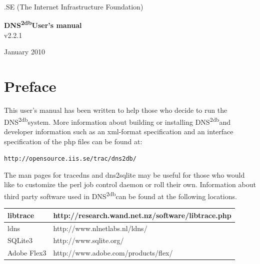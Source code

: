 \documentclass[a4paper]{article}
\newcommand{\dnsdb}{DNS\textsuperscript{2db}\hspace{3pt}}
\begin{document}
\begin{titlepage}
 
\begin{center}
 

 

 
\textsf{\large  .SE (The Internet Infrastructure Foundation)}\\[0.5cm]
 
 
\vspace{3.5cm}

{ \huge \bfseries \dnsdb User's manual }\\[0.4cm]
 v2.2.1 
 


 

 
\vfill
 
{\large January 2010}
 
\end{center}
 
\end{titlepage}

\newpage
\setcounter{page}{2}
\section{Preface}
This user's manual has been written to help those who decide to run the \dnsdb system. 
More information about building or installing \dnsdb and developer information such as an xml-format specification and an interface specification of the php files can be found at:

\verb|http://opensource.iis.se/trac/dns2db/|    

 

The man pages for tracedns and dns2sqlite may be useful for those who would like to customize the perl job control daemon or roll their own.
Information about third party software used in \dnsdb can be found at the following locations.
\begin{center}
    \begin{tabular}{ | l | p{9cm} |}
    \hline
libtrace		&	http://research.wand.net.nz/software/libtrace.php\\ \hline

ldns			&	http://www.nlnetlabs.nl/ldns/\\ \hline

SQLite3			&    http://www.sqlite.org/\\ \hline

Adobe Flex3		&	http://www.adobe.com/products/flex/\\ \hline

    \end{tabular}
\end{center}
\end{document}
